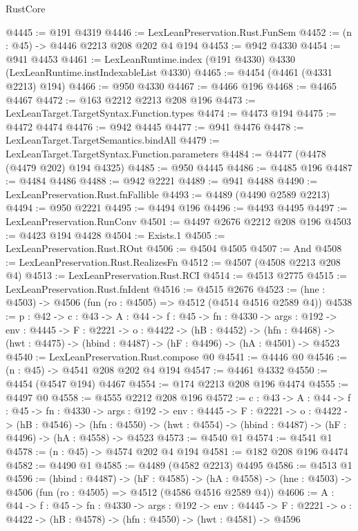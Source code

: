\begin{lexlean}{RustCore}
\begin{coremodule}
@4445 := @191 @4319
@4446 := LexLeanPreservation.Rust.FunSem
@4452 := (n : @45) -> @4446 @2213 @208 @202 @4 @194
@4453 := @942 @4330
@4454 := @941 @4453
@4461 := LexLeanRuntime.index (@191 @4330) @4330 (LexLeanRuntime.instIndexableList @4330)
@4465 := @4454 (@4461 (@4331 @2213) @194)
@4466 := @950 @4330
@4467 := @4466 @196
@4468 := @4465 @4467
@4472 := @163 @2212 @2213 @208 @196
@4473 := LexLeanTarget.TargetSyntax.Function.types
@4474 := @4473 @194
@4475 := @4472 @4474
@4476 := @942 @4445
@4477 := @941 @4476
@4478 := LexLeanTarget.TargetSemantics.bindAll
@4479 := LexLeanTarget.TargetSyntax.Function.parameters
@4484 := @4477 (@4478 (@4479 @202) @194 @4325)
@4485 := @950 @4445
@4486 := @4485 @196
@4487 := @4484 @4486
@4488 := @942 @2221
@4489 := @941 @4488
@4490 := LexLeanPreservation.Rust.fnFallible
@4493 := @4489 (@4490 @2589 @2213)
@4494 := @950 @2221
@4495 := @4494 @196
@4496 := @4493 @4495
@4497 := LexLeanPreservation.RunConv
@4501 := @4497 @2676 @2212 @208 @196
@4503 := @4423 @194 @4428
@4504 := Exists.{1}
@4505 := LexLeanPreservation.Rust.ROut
@4506 := @4504 @4505
@4507 := And
@4508 := LexLeanPreservation.Rust.RealizesFn
@4512 := @4507 (@4508 @2213 @208 @4)
@4513 := LexLeanPreservation.Rust.RCI
@4514 := @4513 @2775
@4515 := LexLeanPreservation.Rust.fnIdent
@4516 := @4515 @2676
@4523 := (hne : @4503) -> @4506 (fun (ro : @4505) => @4512 (@4514 @4516 @2589 @4))
@4538 := {p : @42} ->
  {c : @43} ->
  {A : @44} ->
  {f : @45} ->
  {fn : @4330} ->
  {args : @192} ->
  {env : @4445} ->
  {F : @2221} ->
  {o : @4422} ->
  (hB : @4452) ->
  (hfn : @4468) -> (hwt : @4475) -> (hbind : @4487) -> (hF : @4496) -> (hA : @4501) -> @4523
@4540 := LexLeanPreservation.Rust.compose @0
@4541 := @4446 @0
@4546 := (n : @45) -> @4541 @208 @202 @4 @194
@4547 := @4461 @4332
@4550 := @4454 (@4547 @194) @4467
@4554 := @174 @2213 @208 @196 @4474
@4555 := @4497 @0
@4558 := @4555 @2212 @208 @196
@4572 := {c : @43} ->
  {A : @44} ->
  {f : @45} ->
  {fn : @4330} ->
  {args : @192} ->
  {env : @4445} ->
  {F : @2221} ->
  {o : @4422} ->
  (hB : @4546) ->
  (hfn : @4550) -> (hwt : @4554) -> (hbind : @4487) -> (hF : @4496) -> (hA : @4558) -> @4523
@4573 := @4540 @1
@4574 := @4541 @1
@4578 := (n : @45) -> @4574 @202 @4 @194
@4581 := @182 @208 @196 @4474
@4582 := @4490 @1
@4585 := @4489 (@4582 @2213) @4495
@4586 := @4513 @1
@4596 := (hbind : @4487) ->
  (hF : @4585) ->
  (hA : @4558) -> (hne : @4503) -> @4506 (fun (ro : @4505) => @4512 (@4586 @4516 @2589 @4))
@4606 := {A : @44} ->
  {f : @45} ->
  {fn : @4330} ->
  {args : @192} ->
  {env : @4445} ->
  {F : @2221} -> {o : @4422} -> (hB : @4578) -> (hfn : @4550) -> (hwt : @4581) -> @4596

\end{coremodule}
\end{lexlean}
